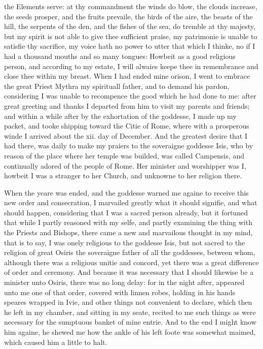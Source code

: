 the Elements serve: at thy commandment the winds do blow, the clouds increase,
the seeds prosper, and the fruits prevaile, the birds of the aire, the beasts
of the hill, the serpents of the den, and the fishes of the sea, do tremble at
thy majesty, but my spirit is not able to give thee sufficient praise, my
patrimonie is unable to satisfie thy sacrifice, my voice hath no power to utter
that which I thinke, no if I had a thousand mouths and so many tongues: Howbeit
as a good religious person, and according to my estate, I will alwaies keepe
thee in remembrance and close thee within my breast. When I had ended mine
orison, I went to embrace the great Priest Mythra my spirituall father, and to
demand his pardon, considering I was unable to recompence the good which he had
done to me: after great greeting and thanks I departed from him to visit my
parents and friends; and within a while after by the exhortation of the
goddesse, I made up my packet, and tooke shipping toward the Citie of Rome,
where with a prosperous winde I arrived about the xii. day of December. And the
greatest desire that I had there, was daily to make my praiers to the
soveraigne goddesse Isis, who by reason of the place where her temple was
builded, was called Campensis, and continually adored of the people of Rome.
Her minister and worshipper was I, howbeit I was a stranger to her Church, and
unknowne to her religion there.

When the yeare was ended, and the goddesse warned me againe to receive this new
order and consecration, I marvailed greatly what it should signifie, and what
should happen, considering that I was a sacred person already, but it fortuned
that while I partly reasoned with my selfe, and partly examining the thing with
the Priests and Bishops, there came a new and marvailous thought in my mind,
that is to say, I was onely religious to the goddesse Isis, but not sacred to
the religion of great Osiris the soveraigne father of all the goddesses,
between whom, although there was a religious unitie and concord, yet there was
a great difference of order and ceremony. And because it was necessary that I
should likewise be a minister unto Osiris, there was no long delay: for in the
night after, appeared unto me one of that order, covered with linnen robes,
holding in his hands speares wrapped in Ivie, and other things not convenient
to declare, which then he left in my chamber, and sitting in my seate, recited
to me such things as were necessary for the sumptuous banket of mine entrie.
And to the end I might know him againe, he shewed me how the ankle of his left
foote was somewhat maimed, which caused him a little to halt.

